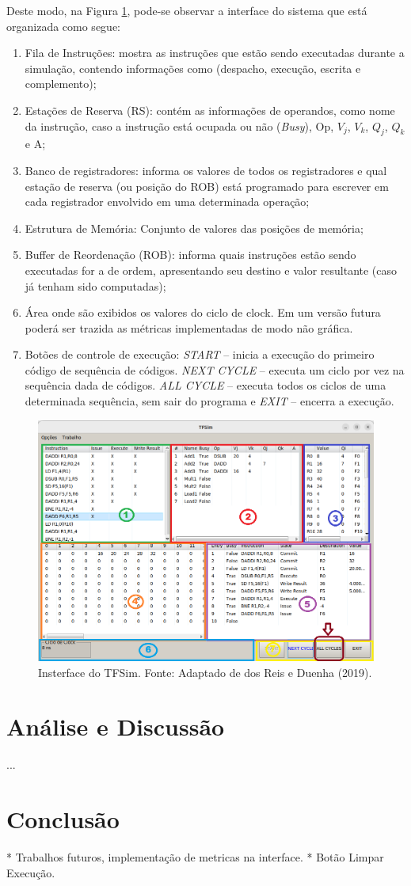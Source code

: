 \documentclass[12pt]{article}
\begin{document}
Deste modo, na Figura \ref{fig_tfsim}, pode-se observar a interface do sistema que está organizada como segue:

\begin{enumerate}
  \item Fila de Instruções: mostra as instruções que estão sendo executadas durante a simulação, contendo informações como (despacho, execução, escrita e complemento);
  \item Estações de Reserva (RS): contém as informações de operandos, como nome da instrução, caso a instrução está ocupada ou não (\textit{Busy}), Op, $V_j$, $V_k$, $Q_j$, $Q_k$ e A;
  \item Banco de registradores: informa os valores de todos os registradores e qual estação de reserva (ou posição do ROB) está programado para escrever em cada registrador envolvido em uma determinada operação;
  \item Estrutura de Memória: Conjunto de valores das posições de memória;
  \item Buffer de Reordenação (ROB): informa quais instruções estão sendo executadas for a de ordem, apresentando seu destino e valor resultante (caso já tenham sido computadas);
  \item Área onde são exibidos os valores do ciclo de clock. Em um versão futura poderá ser trazida as métricas implementadas de modo não gráfica.
  \item Botões de controle de execução: \textit{START} – inicia a execução do primeiro código de sequência de códigos. \textit{NEXT CYCLE} – executa um ciclo por vez na sequência dada de códigos. \textit{ALL CYCLE} – executa todos os ciclos de uma determinada sequência, sem sair do programa e \textit{EXIT} – encerra a execução.
\end{enumerate}

\begin{figure}[h]
  \centering
  \includegraphics[width=.7\textwidth]{img/fig_tfsim.png}
  \caption{Insterface do TFSim. Fonte: Adaptado de dos Reis e Duenha (2019).}
  \label{fig_tfsim}
\end{figure}

\section{Análise e Discussão}

...

\section{Conclusão}\label{sec:figs}

* Trabalhos futuros, implementação de metricas na interface.
* Botão Limpar Execução.



\end{document}
